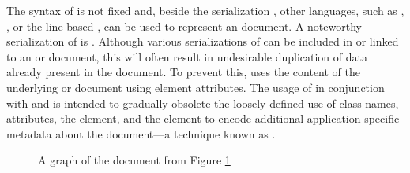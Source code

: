 \documentclass[
  a5paper,10pt,           %
  dvipsnames              %
]{book}
\begin{document}
The syntax of  is not fixed and, beside the 
serialization \cite{lassira99}, other languages, such as ,
 \cite{beckett14:turtle}, or the line-based 
\cite{beckett14:nt}, can be used to represent an  document. A
noteworthy serialization of  is .  Although various
serializations of  can be included in or linked to an
 or  document, this will often result in
undesirable duplication of data already present in the document. To prevent
this,  uses the content of the underlying  or
 document using element attributes. The usage of 
in conjunction with  and  is intended to gradually
obsolete the loosely-defined use of  class names, attributes, the
 element, and the  element to encode additional
application-specific metadata about the document---a technique known as
.

\begin{figure}
  \label{fig:rdf-doc}
\end{figure}

\begin{figure}
\end{figure}

\begin{figure}
  
  \caption{A graph of the  document from Figure
    \ref{fig:rdf-doc}}
\end{figure}

        
\end{document}
